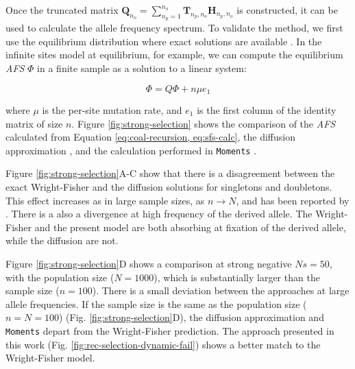 \documentclass[review]{elsarticle}
\newcommand{\ra}{\rightarrow}
\begin{document}
Once the truncated matrix
$\mathbf{Q}_{n_o} = \sum_{n_p=1}^{n_{o}} \mathbf{T}_{n_p,n_o} \mathbf{H}_{n_p,n_o}$ is constructed,
it can be used to calculate the allele frequency spectrum. To validate the method, we first use the
equilibrium distribution where exact solutions are available \cite{Krukov2016}. In the infinite sites
model at equilibrium, for example, we can compute the equilibrium \textit{AFS} $\Phi$ in a finite
sample as a solution to a linear system:

\begin{equation}
  \label{eq:sfs-calc}
  \Phi = Q \Phi  + n \mu e_1
\end{equation}

where $\mu$ is the per-site mutation rate, and $e_1$ is the first column of the identity matrix of
size $n$. Figure \ref{fig:strong-selection} shows the comparison of the \textit{AFS} calculated from
Equation \eqref{eq:coal-recursion, eq:sfs-calc}, the diffusion approximation \cite[eq.
9.23]{Ewens2004}, and the calculation performed in \texttt{Moments} \citep{JouganousEtAl2017}.

Figure \ref{fig:strong-selection}A-C show that there is a disagreement between the exact
Wright-Fisher and the diffusion solutions for singletons and doubletons. This effect increases as in
large sample sizes, as $n \ra N$, and has been reported by \citep{BhaskarEtAl2014}. There is a also
a divergence at high frequency of the derived allele. The Wright-Fisher and the present model are
both absorbing at fixation of the derived allele, while the diffusion are not. 

Figure \ref{fig:strong-selection}D shows a comparison at strong negative $Ns=50$, with the
population size ($N=1000$), which is substantially larger than the sample size ($n=100$). There is a
small deviation between the approaches at large allele frequencies. If the sample size is the same
as the population size ($n=N=100$) (Fig. \ref{fig:strong-selection}D), the diffusion approximation
and \texttt{Moments} depart from the Wright-Fisher prediction. The approach presented in this work
(Fig. \ref{fig:rec-selection-dynamic-fail}) shows a better match to the Wright-Fisher model.
\end{document}

